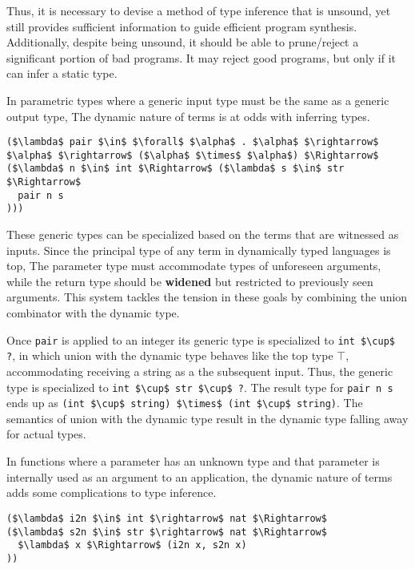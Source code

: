 \documentclass[sigplan,screen]{acmart}
\begin{document}
Thus, it is necessary to devise a method of type inference that is unsound, 
yet still provides sufficient information to guide efficient program synthesis.
Additionally, despite being unsound, it should be able to prune/reject 
a significant portion of bad programs. 
It may reject good programs, but only if it can infer a static type.

In parametric types where a generic input type must be the same as a generic output type,
The dynamic nature of terms is at odds with inferring types.

\begin{lstlisting}
($\lambda$ pair $\in$ $\forall$ $\alpha$ . $\alpha$ $\rightarrow$ $\alpha$ $\rightarrow$ ($\alpha$ $\times$ $\alpha$) $\Rightarrow$ 
($\lambda$ n $\in$ int $\Rightarrow$ ($\lambda$ s $\in$ str $\Rightarrow$ 
  pair n s
)))
\end{lstlisting}

\noindent These generic types can be specialized based on the terms that are witnessed as inputs. 
Since the principal type of any term in dynamically typed languages is top, 
The parameter type must accommodate types of unforeseen arguments, 
while the return type should be \textbf{widened} but restricted 
to previously seen arguments.
This system tackles the tension in these goals by combining the union combinator  
with the dynamic type. 

Once \lstinline{pair} is applied to an integer its generic type is specialized to 
\lstinline{int $\cup$ ?}, 
in which union with the dynamic type behaves like the top type $\top$, 
accommodating receiving a string as a the subsequent input.
Thus, the generic type is specialized to \lstinline{int $\cup$ str $\cup$ ?}.
The result type for \lstinline{pair n s} ends up as 
\lstinline{(int $\cup$ string) $\times$ (int $\cup$ string)}. 
The semantics of union with the dynamic type result in the dynamic type 
falling away for actual types.

In functions where a parameter has an unknown type and that parameter is 
internally used as an argument to an application, the dynamic nature of terms  
adds some complications to type inference.

\begin{lstlisting}
($\lambda$ i2n $\in$ int $\rightarrow$ nat $\Rightarrow$ 
($\lambda$ s2n $\in$ str $\rightarrow$ nat $\Rightarrow$ 
  $\lambda$ x $\Rightarrow$ (i2n x, s2n x)
))

\end{lstlisting}
\end{document}
